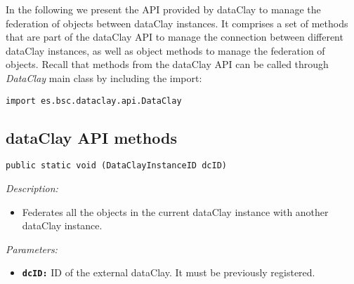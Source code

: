 In the following we present the API provided by dataClay to manage the federation of objects between dataClay instances. It comprises a set of methods that are part of the dataClay API to manage the connection between different dataClay instances, as well as object methods to manage the federation of objects. Recall that methods from the dataClay API can be called through \textit{DataClay} main class by including the import:

\colorbox{basecolor!20}{\texttt{import es.bsc.dataclay.api.DataClay}}

\subsection{dataClay API methods}
\label{sec:JavaFederationAPI}


\begin{dBox}
\texttt{public static void (DataClayInstanceID dcID)}
\LINE

{\it Description:}

\begin{itemize}
  \item Federates all the objects in the current dataClay instance with another dataClay instance. 
\end{itemize}

{\it Parameters:}

\begin{itemize}
  \item \texttt{\bfseries dcID:} ID of the external dataClay. It must be previously registered.
\end{itemize}

\end{dBox}


